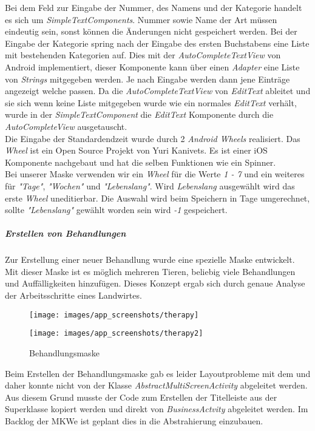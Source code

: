 Bei dem Feld zur Eingabe der Nummer, des Namens und der Kategorie handelt es sich um \textit{SimpleTextComponents}. Nummer sowie Name der Art müssen eindeutig sein, sonst können die Änderungen nicht gespeichert werden. Bei der Eingabe der Kategorie spring nach der Eingabe des ersten Buchstabens eine Liste mit bestehenden Kategorien auf. Dies mit der \textit{AutoCompleteTextView} von Android implementiert, dieser Komponente kann über einen \textit{Adapter} eine Liste von \textit{Strings} mitgegeben werden. Je nach Eingabe werden dann jene Einträge angezeigt welche passen. Da die \textit{AutoCompleteTextView} von \textit{EditText} ableitet und sie sich wenn keine Liste mitgegeben wurde wie ein normales \textit{EditText} verhält, wurde in der \textit{SimpleTextComponent} die \textit{EditText} Komponente durch die \textit{AutoCompleteView} ausgetauscht. \\
Die Eingabe der Standardendzeit wurde durch 2 \textit{Android Wheels} realisiert. Das \textit{Wheel} ist ein Open Source Projekt von Yuri Kanivets. Es ist einer iOS Komponente nachgebaut und hat die selben Funktionen wie ein Spinner. \\
Bei unserer Maske verwenden wir ein \textit{Wheel} für die Werte \textit{1 - 7} und ein weiteres für \textit{"Tage"}, \textit{"Wochen"} und \textit{"Lebenslang"}. Wird \textit{Lebenslang} ausgewählt wird das erste \textit{Wheel} uneditierbar. Die Auswahl wird beim Speichern in Tage umgerechnet, sollte \textit{"Lebenslang"} gewählt worden sein wird \textit{-1} gespeichert. 
\subparagraph{Erstellen von Behandlungen}
Zur Erstellung einer neuer Behandlung wurde eine spezielle Maske entwickelt. Mit dieser Maske ist es möglich mehreren Tieren, beliebig viele Behandlungen und Auffälligkeiten hinzufügen. Dieses Konzept ergab sich durch genaue Analyse der Arbeitsschritte eines Landwirtes.
\begin{figure}[H]
  \centering
  \begin{minipage}[t]{7 cm}
  	\centering
  	\texttt{[image: images/app\_screenshots/therapy]} 
  \end{minipage}
  \hspace{0.5cm}
  \begin{minipage}[t]{7 cm}
	\centering
	\texttt{[image: images/app\_screenshots/therapy2]}  
  \end{minipage}
  \caption{Behandlungsmaske}
\end{figure}
Beim Erstellen der Behandlungsmaske gab es leider Layoutprobleme mit dem  und daher konnte nicht von der Klasse \textit{AbstractMultiScreenActivity} abgeleitet werden. Aus diesem Grund musste der Code zum Erstellen der Titelleiste aus der Superklasse kopiert werden und direkt von \textit{BusinessActvity} abgeleitet werden. Im Backlog der MKWe ist geplant dies in die Abstrahierung einzubauen. \\[0.5em]
